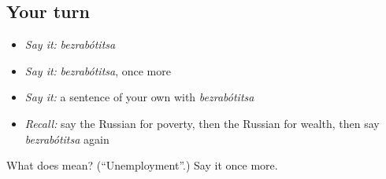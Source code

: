 \subsection*{Your turn}
\begin{itemize}
\raggedright
  \item \emph{Say it:} \emph{bezrabótitsa}
  \item \emph{Say it:} \emph{bezrabótitsa}, once more
  \item \emph{Say it:} a sentence of your own with \emph{bezrabótitsa}
  \item \emph{Recall:} say the Russian for poverty, then the Russian for wealth, then say \emph{bezrabótitsa} again
\end{itemize}

\begin{tcolorbox}[breakable,colback=teal!4,colframe=teal!35!black,title={Before you move on}]
What does  mean? (\textquotedblleft{}Unemployment\textquotedblright{}.) Say it once more.
\end{tcolorbox}
